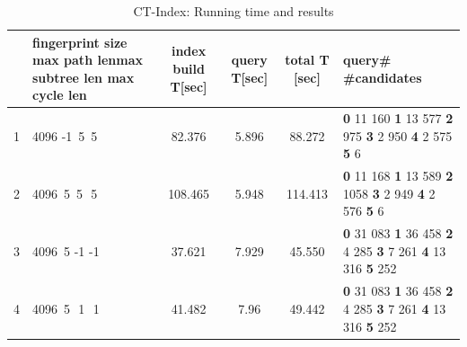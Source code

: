\documentclass{l4proj}
\theoremstyle{definition}
\begin{document}
\newcommand\TstrutT{\rule{0pt}{2.6ex}}         %
\newcommand\Bstrut{\rule[-1ex]{0pt}{0pt}} 
\begin{table}[H]
\caption{CT-Index: Running time and results}
\label{table:runningTime}
\begin{center}
\begin{tabular}{ |c|p{25mm}|c|c|c|p{18mm}|}\hline
 & fingerprint size \newline max path len\newline max subtree len \newline max cycle len & index build T[sec]& query T[sec]& total T [sec] & \textbf{query\#} \#candidates\TstrutT\Bstrut\\
 \hline
1& 4096 -1 \,5 \,5  & 82.376 & 5.896 & 88.272 & \textbf{0} 11 160 \newline \textbf{1} 13 577 \newline \textbf{2} 975 \newline \textbf{3} 2 950 \newline \textbf{4} 2 575 \newline \textbf{5} 6 \TstrutT\Bstrut\\ 
 \hline
2 & 4096 \,5 \,5 \,\,5 & 108.465  & 5.948 & 114.413 & \textbf{0} 11 168 \newline \textbf{1} 13 589 \newline \textbf{2} 1058 \newline \textbf{3} 2 949 \newline \textbf{4} 2 576 \newline \textbf{5} 6 \TstrutT\Bstrut \\ 
 \hline
3 & 4096 \,5 -1 -1 & 37.621  & 7.929 & 45.550 & \textbf{0} 31 083 \newline \textbf{1} 36 458 \newline \textbf{2} 4 285 \newline \textbf{3} 7 261 \newline \textbf{4} 13 316 \newline \textbf{5} 252 \TstrutT\Bstrut \\ 
 \hline 
4 & 4096 \,5 \,\,1 \,\,1 & 41.482  & 7.96 & 49.442 & \textbf{0} 31 083 \newline \textbf{1} 36 458 \newline \textbf{2} 4 285 \newline \textbf{3} 7 261 \newline \textbf{4} 13 316 \newline \textbf{5} 252 \TstrutT\Bstrut\\ 

\end{tabular}
\end{center}
\end{table}
\end{document}
